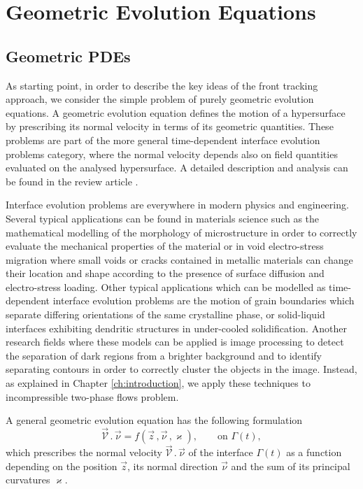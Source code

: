 \chapter{\sc Geometric Evolution Equations}
\label{ch:geometric}

\section[Geometric PDEs]{Geometric PDEs}
As starting point, in order to describe the key ideas of the front tracking
approach, we consider the simple problem of purely geometric evolution
equations. A geometric evolution equation defines the motion of a hypersurface
by prescribing its normal velocity in terms of its geometric quantities. These
problems are part of the more general time-dependent interface evolution
problems category, where the normal velocity depends also on field quantities
evaluated on the analysed hypersurface. A detailed description and analysis can
be found in the review article \cite{DeckelnickDE05}.

Interface evolution problems are everywhere in modern physics and engineering.
Several typical applications can be found in materials science such as the
mathematical modelling of the morphology of microstructure in order to
correctly evaluate the mechanical properties of the material or in void
electro-stress migration where small voids or cracks contained in metallic
materials can change their location and shape according to the presence of
surface diffusion and electro-stress loading. Other typical applications which
can be modelled as time-dependent interface evolution problems are the motion of
grain boundaries which separate differing orientations of the same crystalline
phase, or solid-liquid interfaces exhibiting dendritic structures in
under-cooled solidification. Another research fields where these models can be
applied is image processing to detect the separation of dark regions from a
brighter background and to identify separating contours in order to correctly
cluster the objects in the image. Instead, as explained in Chapter
\ref{ch:introduction}, we apply these techniques to incompressible two-phase
flows problem.

A general geometric evolution equation has the following formulation
\begin{equation}\label{eq:geometric_pde}
\vec{\mathcal{V}}\,.\,\vec\nu=f(\vec{z}\,,\vec{\nu}\,,\varkappa),
\qquad\mbox{on }\Gamma(t),
\end{equation}
which prescribes the normal velocity $\vec{\mathcal{V}}\,.\,\vec\nu$ of the
interface $\Gamma(t)$ as a function depending on the position $\vec z$, its
normal direction $\vec{\nu}$ and the sum of its principal curvatures
$\varkappa$.

